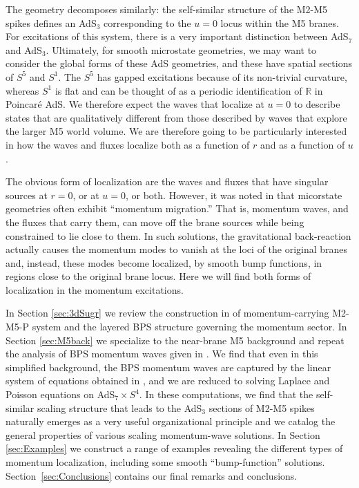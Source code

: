 \documentclass[11pt]{article}
\def\IR{\mathbb{R}}
\numberwithin{equation}{section}
\begin{document}
The geometry decomposes similarly: the self-similar structure of the M2-M5 spikes \cite{Bena:2023rzm,Bena:2025hxt} defines an AdS$_3$ corresponding to the $u=0$ locus within the M5 branes.  For excitations of this system, there is a very important distinction between  AdS$_7$ and  AdS$_3$.   Ultimately, for smooth microstate geometries, we may want to consider the global forms of these AdS geometries, and these have spatial sections of $S^5$ and $S^1$.   The $S^5$ has gapped excitations because of its non-trivial curvature, whereas $S^1$ is flat and can be thought of as  a periodic identification of $\IR$ in Poincar\'e AdS.  We therefore expect the waves that localize at $u=0$ to describe states that are qualitatively different from those described by waves that explore the larger M5 world volume.  We are therefore going to be particularly interested in how the waves and fluxes localize both as a function of $r$ and as a function of $u$. 

The obvious form of localization are the waves and fluxes that have singular sources at $r=0$, or at $u=0$, or both.  However, it was noted in \cite{Bena:2025uyg} that micorstate geometries often exhibit ``momentum migration.''  That is, momentum waves, and the fluxes that carry them, can  move off the brane sources while being constrained to lie close to them.  In such solutions, the gravitational back-reaction actually causes the  momentum modes to vanish at the loci of the original branes  and, instead, these modes  become localized, by smooth bump functions, in regions close to the original brane locus.  Here we will find both forms of localization in the momentum excitations.

 In Section \ref{sec:3dSugr}  we review the construction in  \cite{Bena:2024qed}  of momentum-carrying M2-M5-P system and the layered BPS structure governing the momentum sector.   In Section \ref{sec:M5back} we specialize to the near-brane M5 background and repeat the analysis of BPS momentum waves given in   \cite{Bena:2024qed}.   We find that even in this simplified background, the BPS momentum waves are captured by the linear system of equations obtained  in \cite{Bena:2024qed}, and we are reduced to solving Laplace and Poisson equations on  AdS$_7 \times S^4$.  In these computations, we find that the self-similar scaling structure that leads to the AdS$_3$ sections of M2-M5 spikes naturally emerges as a very useful organizational principle and we catalog the general properties of various scaling momentum-wave solutions.   In Section \ref{sec:Examples} we construct a range of examples revealing the different types of momentum localization, including some smooth ``bump-function'' solutions.  Section~\ref{sec:Conclusions} contains our final remarks and conclusions.
\end{document}
